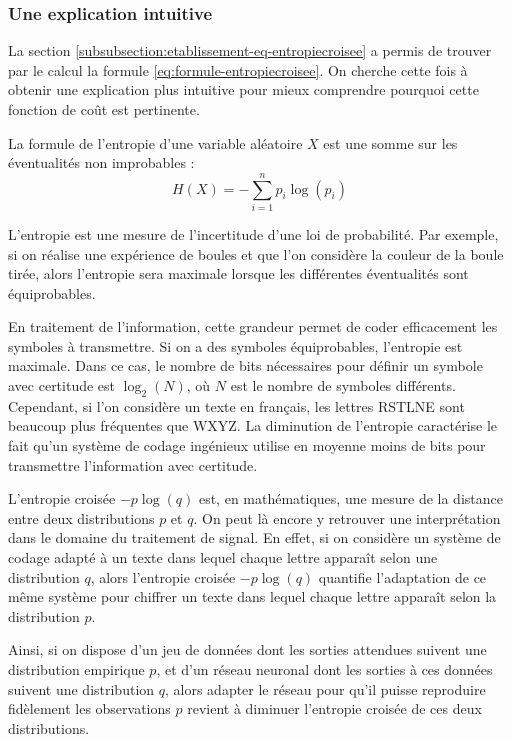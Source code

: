 \subsubsection{Une explication intuitive}

La section \ref{subsubsection:etablissement-eq-entropiecroisee} a permis de trouver par le calcul la formule \ref{eq:formule-entropiecroisee}.
On cherche cette fois à obtenir une explication plus intuitive pour mieux comprendre pourquoi cette fonction de coût est pertinente.

La formule de l'entropie d'une variable aléatoire $X$ est une somme sur les éventualités non improbables :
\begin{equation}
 H(X) = -\sum_{i=1}^{n} p_i\log\left(p_i\right)
\end{equation}

L'entropie est une mesure de l'incertitude d'une loi de probabilité. Par exemple, si on réalise une expérience de boules et que l'on considère
la couleur de la boule tirée, alors l'entropie sera maximale lorsque les différentes éventualités sont équiprobables.

En traitement de l'information, cette grandeur permet de coder efficacement les symboles à transmettre. Si on a des symboles équiprobables,
l'entropie est maximale. Dans ce cas, le nombre de bits nécessaires pour définir un symbole avec certitude est $\log_2\left(N\right)$, où $N$ est le nombre
de symboles différents. Cependant, si l'on considère un texte en français, les lettres RSTLNE sont beaucoup plus fréquentes que WXYZ. La diminution de l'entropie
caractérise le fait qu'un système de codage ingénieux utilise en moyenne moins de bits pour transmettre l'information avec certitude.

L'entropie croisée $-p\log\left(q\right)$ est, en mathématiques, une mesure de la distance entre deux distributions $p$ et $q$. On peut là encore y 
retrouver une interprétation dans le domaine du traitement de signal. 
En effet, si on considère un système de codage adapté à un texte dans lequel chaque lettre apparaît selon une distribution $q$, alors
l'entropie croisée $-p\log\left(q\right)$ quantifie l'adaptation de ce même système pour chiffrer un texte dans lequel 
chaque lettre apparaît selon la distribution $p$.

Ainsi, si on dispose d'un jeu de données dont les sorties attendues suivent une distribution empirique $p$, et d'un réseau neuronal dont les sorties
à ces données suivent une distribution $q$, alors adapter le réseau pour qu'il puisse reproduire fidèlement les observations $p$ revient 
à diminuer l'entropie croisée de ces deux distributions.

